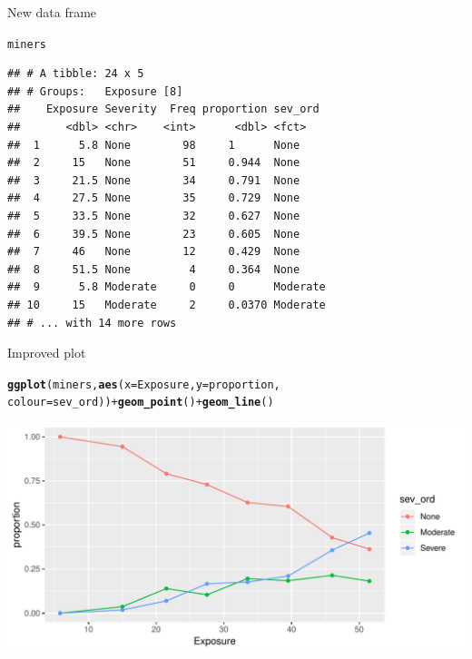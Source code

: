 \documentclass[unknownkeysallowed]{beamer}\usepackage[]{graphicx}\usepackage[]{color}
\makeatletter
\def\maxwidth{ %
  \ifdim\Gin@nat@width>\linewidth
    \linewidth
  \else
    \Gin@nat@width
  \fi
}
\newcommand{\hlopt}[1]{\textcolor[rgb]{0,0,0}{#1}}%
\newcommand{\hlstd}[1]{\textcolor[rgb]{0.345,0.345,0.345}{#1}}%
\newcommand{\hlkwc}[1]{\textcolor[rgb]{0.333,0.667,0.333}{#1}}%
\newcommand{\hlkwd}[1]{\textcolor[rgb]{0.737,0.353,0.396}{\textbf{#1}}}%
\newenvironment{kframe}{%
 \def\at@end@of@kframe{}%
 \ifinner\ifhmode%
  \def\at@end@of@kframe{\end{minipage}}%
  \begin{minipage}{\columnwidth}%
 \fi\fi%
 \def\FrameCommand##1{\hskip\@totalleftmargin \hskip-\fboxsep
 \colorbox{shadecolor}{##1}\hskip-\fboxsep
     \hskip-\linewidth \hskip-\@totalleftmargin \hskip\columnwidth}%
 \MakeFramed {\advance\hsize-\width
   \@totalleftmargin\z@ \linewidth\hsize
   \@setminipage}}%
 {\par\unskip\endMakeFramed%
 \at@end@of@kframe}
\newenvironment{knitrout}{}{} %
\makeatother
\begin{document}
\begin{frame}[fragile]{New data frame}

\begin{knitrout}
\color{fgcolor}\begin{kframe}
\begin{alltt}
\hlstd{miners}
\end{alltt}
\begin{verbatim}
## # A tibble: 24 x 5
## # Groups:   Exposure [8]
##    Exposure Severity  Freq proportion sev_ord 
##       <dbl> <chr>    <int>      <dbl> <fct>   
##  1      5.8 None        98     1      None    
##  2     15   None        51     0.944  None    
##  3     21.5 None        34     0.791  None    
##  4     27.5 None        35     0.729  None    
##  5     33.5 None        32     0.627  None    
##  6     39.5 None        23     0.605  None    
##  7     46   None        12     0.429  None    
##  8     51.5 None         4     0.364  None    
##  9      5.8 Moderate     0     0      Moderate
## 10     15   Moderate     2     0.0370 Moderate
## # ... with 14 more rows
\end{verbatim}
\end{kframe}
\end{knitrout}
  
\end{frame}


\begin{frame}[fragile]{Improved plot}
  
\begin{knitrout}\small
{}\color{fgcolor}\begin{kframe}
\begin{alltt}
\hlkwd{ggplot}\hlstd{(miners,}\hlkwd{aes}\hlstd{(}\hlkwc{x}\hlstd{=Exposure,}\hlkwc{y}\hlstd{=proportion,}
    \hlkwc{colour}\hlstd{=sev_ord))}\hlopt{+}\hlkwd{geom_point}\hlstd{()}\hlopt{+}\hlkwd{geom_line}\hlstd{()}
\end{alltt}
\end{kframe}
\includegraphics[width=\maxwidth]{figure/unnamed-chunk-85-1} 

\end{knitrout}
   
  
\end{frame}
\end{document}
